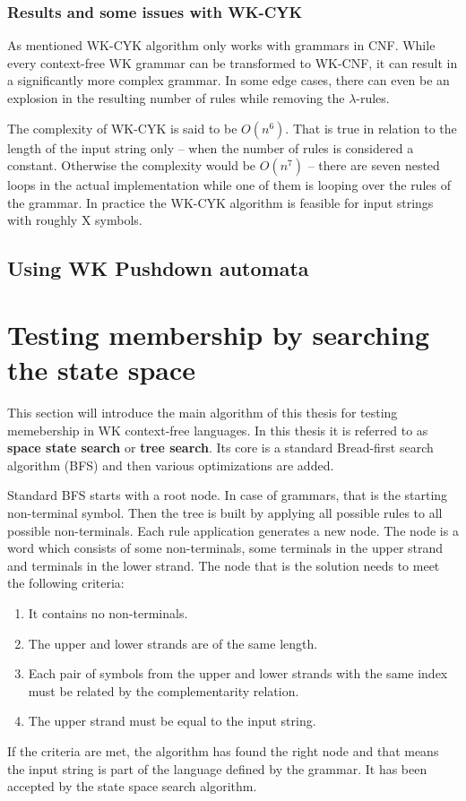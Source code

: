 \subsection{Results and some issues with WK-CYK}
As mentioned WK-CYK algorithm only works with grammars in CNF. While every context-free WK grammar can be transformed to WK-CNF, it can result in a significantly more complex grammar. In some edge cases, there can even be an explosion in the resulting number of rules while removing the $\lambda$-rules.

The complexity of WK-CYK is said to be $O(n^6)$. That is true in relation to the length of the input string only -- when the number of rules is considered a constant. Otherwise the complexity would be $O(n^7)$ -- there are seven nested loops in the actual implementation while one of them is looping over the rules of the grammar.
In practice the WK-CYK algorithm is feasible for input strings with roughly X symbols.


\section{Using WK Pushdown automata}

\chapter{Testing membership by searching the state space}
This section will introduce the main algorithm of this thesis for testing memebership in WK context-free languages. In this thesis it is referred to as \textbf{space state search} or \textbf{tree search}. Its core is a standard Bread-first search algorithm (BFS) and then various optimizations are added.

Standard BFS starts with a root node. In case of grammars, that is the starting non-terminal symbol. Then the tree is built by applying all possible rules to all possible non-terminals. Each rule application generates a new node. The node is a word which consists of some non-terminals, some terminals in the upper strand and terminals in the lower strand. The node that is the solution needs to meet the following criteria:
\begin{enumerate}
  \item{It contains no non-terminals.}
  \item{The upper and lower strands are of the same length.}
  \item{Each pair of symbols from the upper and lower strands with the same index must be related by the complementarity relation.}
  \item{The upper strand must be equal to the input string.}
\end{enumerate}
If the criteria are met, the algorithm has found the right node and that means the input string is part of the language defined by the grammar. It has been accepted by the state space search algorithm.

